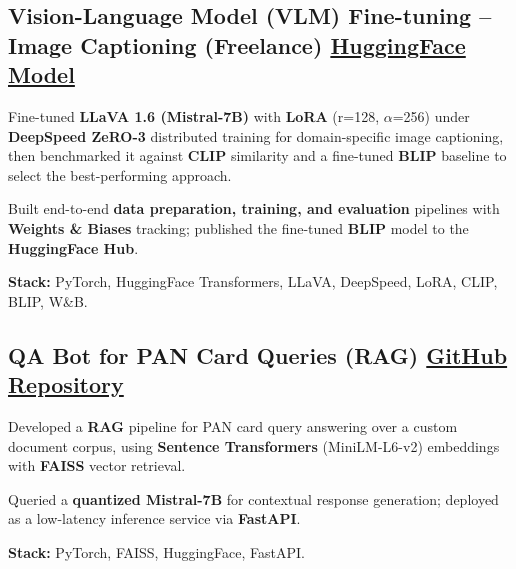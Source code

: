 \documentclass[letter,10pt]{article}
\begin{document}
\subsection{Vision-Language Model (VLM) Fine-tuning – Image Captioning (Freelance) \hfill \href{https://huggingface.co/sunil448832/blip-model}{HuggingFace Model}}
\begin{zitemize}
\item Fine-tuned \textbf{LLaVA 1.6 (Mistral-7B)} with \textbf{LoRA} (r=128, $\alpha$=256) under \textbf{DeepSpeed ZeRO-3} distributed training for domain-specific image captioning, then benchmarked it against \textbf{CLIP} similarity and a fine-tuned \textbf{BLIP} baseline to select the best-performing approach.
\item Built end-to-end \textbf{data preparation, training, and evaluation} pipelines with \textbf{Weights \& Biases} tracking; published the fine-tuned \textbf{BLIP} model to the \textbf{HuggingFace Hub}.
\item \textbf{Stack:} PyTorch, HuggingFace Transformers, LLaVA, DeepSpeed, LoRA, CLIP, BLIP, W\&B.
\end{zitemize}

\subsection{QA Bot for PAN Card Queries (RAG) \hfill \href{https://github.com/sunil448832/Natural-Language-Processing/tree/master/RAG(Retrieval\%20Augment\%20Generation)}{GitHub Repository}}
\begin{zitemize}
\item Developed a \textbf{RAG} pipeline for PAN card query answering over a custom document corpus, using \textbf{Sentence Transformers} (MiniLM-L6-v2) embeddings with \textbf{FAISS} vector retrieval.
\item Queried a \textbf{quantized Mistral-7B} for contextual response generation; deployed as a low-latency inference service via \textbf{FastAPI}.
\item \textbf{Stack:} PyTorch, FAISS, HuggingFace, FastAPI.
\end{zitemize}
\end{document}
